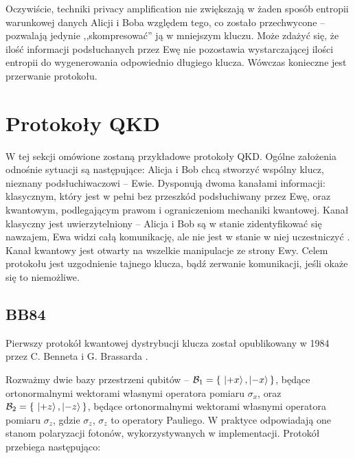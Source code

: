 \documentclass[10pt]{article}
\begin{document}
\vspace{3mm}

Oczywiście, techniki privacy amplification nie zwiększają w żaden sposób entropii warunkowej danych
Alicji i Boba względem tego, co zostało przechwycone -- pozwalają jedynie ,,skompresować'' ją w
mniejszym kluczu. Może zdażyć się, że ilość informacji podsłuchanych przez Ewę nie pozostawia 
wystarczającej ilości entropii do wygenerowania odpowiednio długiego klucza. Wówczas konieczne jest
przerwanie protokołu. 


\section{Protokoły QKD}

W tej sekcji omówione zostaną przykładowe protokoły QKD. Ogólne założenia odnośnie sytuacji są
następujące: Alicja i Bob chcą stworzyć wspólny klucz, nieznany podsłuchiwaczowi -- Ewie. Dysponują
dwoma kanałami informacji: klasycznym, który jest w pełni bez przeszkód podsłuchiwany przez Ewę,
oraz kwantowym, podlegającym prawom i ograniczeniom mechaniki kwantowej. Kanał klasyczny jest
uwierzytelniony -- Alicja i Bob są w stanie zidentyfikować się nawzajem, Ewa widzi całą komunikację,
ale nie jest w stanie w niej uczestniczyć \footnotemark. Kanał kwantowy jest otwarty na wszelkie 
manipulacje ze strony Ewy. Celem protokołu jest uzgodnienie tajnego klucza, bądź zerwanie komunikacji,
jeśli okaże się to niemożliwe.


\subsection{BB84}

Pierwszy \cite{Scarani09} protokół kwantowej dystrybucji klucza został opublikowany w 1984 przez
C. Benneta i G. Brassarda \cite{bb84}. 

Rozważmy dwie bazy przestrzeni qubitów -- \(\mathcal{B}_1 = \left\{\ \Ket{+x}, \Ket{-x}\,\right\}\), 
będące ortonormalnymi wektorami własnymi operatora pomiaru \(\sigma_x\), oraz 
\(\mathcal{B}_2 = \left\{\ \Ket{+z}, \Ket{-z}\,\right\}\), będące ortonormalnymi wektorami własnymi
operatora pomiaru \(\sigma_z\), gdzie \(\sigma_z\), \(\sigma_z\) to operatory Pauliego. W praktyce
odpowiadają one stanom polaryzacji fotonów, wykorzystywanych w implementacji. Protokół przebiega 
następująco:
\end{document}
